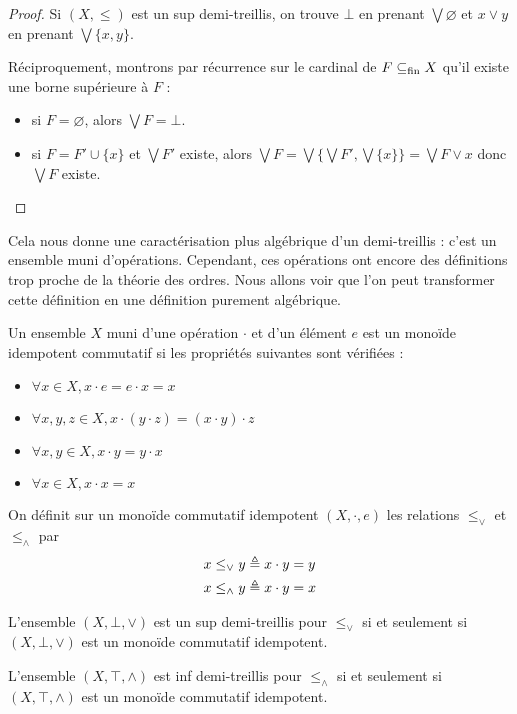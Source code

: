 \begin{proof}
  Si $(X,\leq)$ est un sup demi-treillis, on trouve $\bot$ en prenant
  $\bigvee\varnothing$ et $x\lor y$ en prenant $\bigvee\{x,y\}$.

  Réciproquement, montrons par récurrence sur le cardinal de $F\subseteq_{\mathrm{fin}} X$ qu'il
  existe une borne supérieure à $F$ :
  \begin{itemize}
  \item si $F = \varnothing$, alors $\bigvee F = \bot$.
  \item si $F = F' \cup \{x\}$ et $\bigvee F'$ existe, alors
    $\bigvee F = \bigvee \{\bigvee F',\bigvee \{x\}\} = \bigvee F \lor x$
    donc $\bigvee F$ existe.
  \end{itemize}
\end{proof}

Cela nous donne une caractérisation plus algébrique d'un demi-treillis : c'est
un ensemble muni d'opérations. Cependant, ces opérations ont encore des
définitions trop proche de la théorie des ordres. Nous allons voir que l'on peut
transformer cette définition en une définition purement algébrique.

\begin{definition}
  Un ensemble $X$ muni d'une opération $\cdot$ et d'un élément $e$ est un
  monoïde idempotent commutatif si les propriétés suivantes sont vérifiées :
  \begin{itemize}
  \item $\forall x\in X, x\cdot e = e \cdot x = x$
  \item $\forall x,y,z\in X, x \cdot (y \cdot z) = (x \cdot y) \cdot z$
  \item $\forall x,y\in X, x\cdot y = y \cdot x$
  \item $\forall x\in X, x\cdot x = x$
  \end{itemize}

  On définit sur un monoïde commutatif idempotent $(X,\cdot,e)$ les relations
  $\leq_\lor$ et $\leq_\land$ par
  \begin{align*}
    x \leq_\lor y &\triangleq x \cdot y = y \\
    x \leq_\land y &\triangleq x \cdot y = x
  \end{align*}
\end{definition}

\begin{proposition}
  L'ensemble $(X,\bot,\lor)$ est un sup demi-treillis pour $\leq_\lor$ si et
  seulement si $(X,\bot,\lor)$ est un monoïde commutatif idempotent.

  L'ensemble $(X,\top,\land)$ est inf demi-treillis pour $\leq_\land$ si et
  seulement si $(X,\top,\land)$ est un monoïde commutatif idempotent.
\end{proposition}

